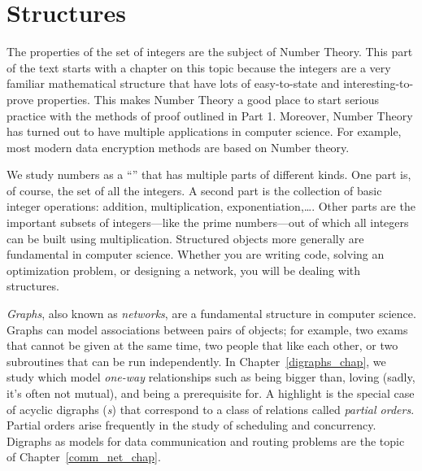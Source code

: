 \part{Structures}
\label{part:structures}

\partintro

The properties of the set of integers are the subject of Number
Theory.  This part of the text starts with a chapter on this topic
because the integers are a very familiar mathematical structure that
have lots of easy-to-state and interesting-to-prove properties.  This
makes Number Theory a good place to start serious practice with the
methods of proof outlined in Part 1.  Moreover, Number Theory has
turned out to have multiple applications in computer science.  For
example, most modern data encryption methods are based on Number
theory.

We study numbers as a ``'' that has multiple parts of
different kinds.  One part is, of course, the set of all the integers.
A second part is the collection of basic integer operations:
addition, multiplication, exponentiation,\dots.  Other parts are the
important subsets of integers---like the prime numbers---out of which
all integers can be built using multiplication.  Structured objects
more generally are fundamental in computer science.  Whether you are
writing code, solving an optimization problem, or designing a network,
you will be dealing with structures.

\iffalse
The better you can understand the structure, the better your results will be.
And if you can reason about structure, then you will be in a good
position to convince others (and yourself) that your results are
worthy.\fi

\emph{Graphs}, also known as \emph{networks}, are a fundamental
structure in computer science.  Graphs can model associations between
pairs of objects; for example, two exams that cannot be given at the
same time, two people that like each other, or two subroutines that
can be run independently.  In Chapter~\ref{digraphs_chap}, we study
\emph{} which model \emph{one-way} relationships
such as being bigger than, loving (sadly, it's often not mutual), and
being a prerequisite for.  A highlight is the special case of acyclic
digraphs (\emph{s}) that correspond to a class of relations
called \emph{partial orders}.  Partial orders arise frequently in the
study of scheduling and concurrency.  Digraphs as models for data
communication and routing problems are the topic of
Chapter~\ref{comm_net_chap}.

